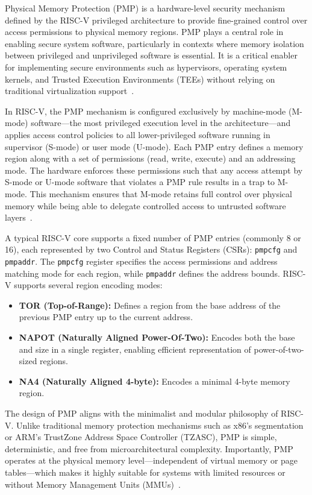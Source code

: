 Physical Memory Protection (PMP) is a hardware-level security mechanism defined by the RISC-V privileged architecture to provide fine-grained control over access permissions to physical memory regions. PMP plays a central role in enabling secure system software, particularly in contexts where memory isolation between privileged and unprivileged software is essential. It is a critical enabler for implementing secure environments such as hypervisors, operating system kernels, and Trusted Execution Environments (TEEs) without relying on traditional virtualization support~\cite{riscvprivspec}.

In RISC-V, the PMP mechanism is configured exclusively by machine-mode (M-mode) software—the most privileged execution level in the architecture—and applies access control policies to all lower-privileged software running in supervisor (S-mode) or user mode (U-mode). Each PMP entry defines a memory region along with a set of permissions (read, write, execute) and an addressing mode. The hardware enforces these permissions such that any access attempt by S-mode or U-mode software that violates a PMP rule results in a trap to M-mode. This mechanism ensures that M-mode retains full control over physical memory while being able to delegate controlled access to untrusted software layers~\cite{riscvprivspec,lee2019keystone}.

A typical RISC-V core supports a fixed number of PMP entries (commonly 8 or 16), each represented by two Control and Status Registers (CSRs): \texttt{pmpcfg} and \texttt{pmpaddr}. The \texttt{pmpcfg} register specifies the access permissions and address matching mode for each region, while \texttt{pmpaddr} defines the address bounds. RISC-V supports several region encoding modes:

\begin{itemize}
    \item \textbf{TOR (Top-of-Range):} Defines a region from the base address of the previous PMP entry up to the current address.
    \item \textbf{NAPOT (Naturally Aligned Power-Of-Two):} Encodes both the base and size in a single register, enabling efficient representation of power-of-two-sized regions.
    \item \textbf{NA4 (Naturally Aligned 4-byte):} Encodes a minimal 4-byte memory region.
\end{itemize}

The design of PMP aligns with the minimalist and modular philosophy of RISC-V. Unlike traditional memory protection mechanisms such as x86's segmentation or ARM's TrustZone Address Space Controller (TZASC), PMP is simple, deterministic, and free from microarchitectural complexity. Importantly, PMP operates at the physical memory level—independent of virtual memory or page tables—which makes it highly suitable for systems with limited resources or without Memory Management Units (MMUs)~\cite{riscvprivspec,Survey2023}.

